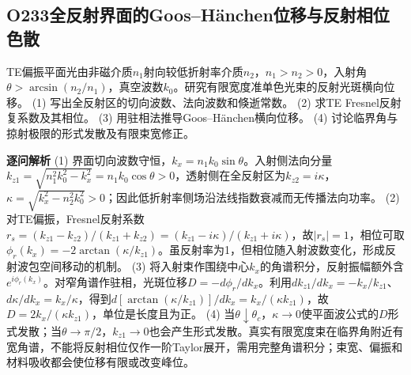 \subsection*{O233\quad 全反射界面的Goos–Hänchen位移与反射相位色散}
TE偏振平面光由非磁介质$n_1$射向较低折射率介质$n_2$，$n_1>n_2>0$，入射角$\theta>\arcsin(n_2/n_1)$，真空波数$k_0$。研究有限宽度准单色光束的反射光斑横向位移。
(1) 写出全反射区的切向波数、法向波数和倏逝常数。
(2) 求TE Fresnel反射复系数及其相位。
(3) 用驻相法推导Goos–Hänchen横向位移。
(4) 讨论临界角与掠射极限的形式发散及有限束宽修正。
\par\textbf{逐问解析}
(1) 界面切向波数守恒，$k_x=n_1k_0\sin\theta$。入射侧法向分量$k_{z1}=\sqrt{n_1^2k_0^2-k_x^2}=n_1k_0\cos\theta>0$，透射侧在全反射区为$k_{z2}=i\kappa$，$\kappa=\sqrt{k_x^2-n_2^2k_0^2}>0$；因此低折射率侧场沿法线指数衰减而无传播法向功率。
(2) 对TE偏振，Fresnel反射系数$r_s=(k_{z1}-k_{z2})/(k_{z1}+k_{z2})=(k_{z1}-i\kappa)/(k_{z1}+i\kappa)$，故$|r_s|=1$，相位可取$\phi_r(k_x)=-2\arctan(\kappa/k_{z1})$。虽反射率为1，但相位随入射波数变化，形成反射波包空间移动的机制。
(3) 将入射束作围绕中心$k_x$的角谱积分，反射振幅额外含$e^{i\phi_r(k_x)}$。对窄角谱作驻相，光斑位移$D=-d\phi_r/dk_x$。利用$dk_{z1}/dk_x=-k_x/k_{z1}$、$d\kappa/dk_x=k_x/\kappa$，得到$d[\arctan(\kappa/k_{z1})]/dk_x=k_x/(\kappa k_{z1})$，故$D=2k_x/(\kappa k_{z1})$，单位是长度且为正。
(4) 当$\theta\downarrow\theta_c$，$\kappa\to0$使平面波公式的$D$形式发散；当$\theta\to\pi/2$，$k_{z1}\to0$也会产生形式发散。真实有限宽度束在临界角附近有宽角谱，不能将反射相位仅作一阶Taylor展开，需用完整角谱积分；束宽、偏振和材料吸收都会使位移有限或改变峰位。
\par\medskip
